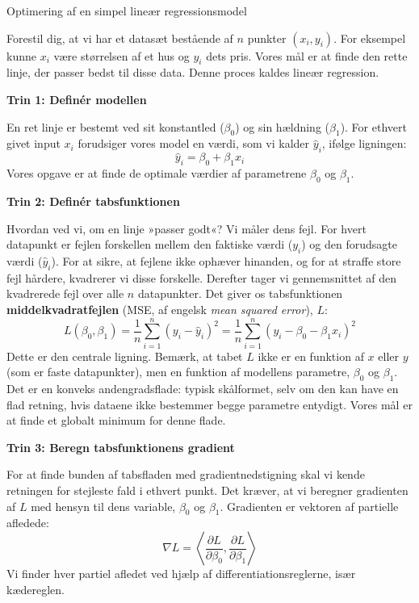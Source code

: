 \begin{example}
    Optimering af en simpel lineær regressionsmodel
\end{example}

\begin{solution}
Forestil dig, at vi har et datasæt bestående af \(n\) punkter \((x_i, y_i)\). For eksempel kunne \(x_i\) være størrelsen af et hus og \(y_i\) dets pris. Vores mål er at finde den rette linje, der passer bedst til disse data. Denne proces kaldes lineær regression.

\vspace{1em}
\textbf{Trin 1: Definér modellen}

En ret linje er bestemt ved sit konstantled (\(\beta_0\)) og sin hældning (\(\beta_1\)). For ethvert givet input \(x_i\) forudsiger vores model en værdi, som vi kalder \(\hat{y}_i\), ifølge ligningen:
\[
\hat{y}_i = \beta_0 + \beta_1 x_i
\]
Vores opgave er at finde de optimale værdier af parametrene \(\beta_0\) og \(\beta_1\).

\vspace{1em}
\textbf{Trin 2: Definér tabsfunktionen}

Hvordan ved vi, om en linje »passer godt«? Vi måler dens fejl. For hvert datapunkt er fejlen forskellen mellem den faktiske værdi (\(y_i\)) og den forudsagte værdi (\(\hat{y}_i\)). For at sikre, at fejlene ikke ophæver hinanden, og for at straffe store fejl hårdere, kvadrerer vi disse forskelle. Derefter tager vi gennemsnittet af den kvadrerede fejl over alle \(n\) datapunkter. Det giver os tabsfunktionen \textbf{middelkvadratfejlen} (MSE, af engelsk \emph{mean squared error}), \(L\):
\[
L(\beta_0, \beta_1) = \frac{1}{n} \sum_{i=1}^{n} (y_i - \hat{y}_i)^2 = \frac{1}{n} \sum_{i=1}^{n} (y_i - \beta_0 - \beta_1 x_i)^2
\]
Dette er den centrale ligning. Bemærk, at tabet \(L\) ikke er en funktion af \(x\) eller \(y\) (som er faste datapunkter), men en funktion af modellens parametre, \(\beta_0\) og \(\beta_1\). Det er en konveks andengradsflade: typisk skålformet, selv om den kan have en flad retning, hvis dataene ikke bestemmer begge parametre entydigt. Vores mål er at finde et globalt minimum for denne flade.

\vspace{1em}
\textbf{Trin 3: Beregn tabsfunktionens gradient}

For at finde bunden af tabsfladen med gradientnedstigning skal vi kende retningen for stejleste fald i ethvert punkt. Det kræver, at vi beregner gradienten af \(L\) med hensyn til dens variable, \(\beta_0\) og \(\beta_1\). Gradienten er vektoren af partielle afledede:
\[
\nabla L = \left\langle \frac{\partial L}{\partial \beta_0}, \frac{\partial L}{\partial \beta_1} \right\rangle
\]
Vi finder hver partiel afledet ved hjælp af differentiationsreglerne, især kædereglen.


\end{solution}
